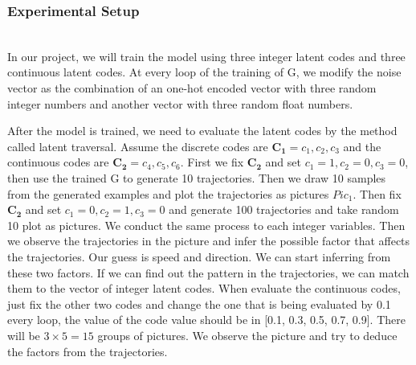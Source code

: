 \subsubsection{Experimental Setup}

\hfill \\
In our project, we will train the model using three integer latent codes and three continuous latent codes. At every loop of the training of G, we modify the noise vector as the combination of an one-hot encoded vector with three random integer numbers and another vector with three random float numbers.

After the model is trained, we need to evaluate the latent codes by the method called latent traversal. Assume the discrete codes are \(\mathbf{C_1} = c_1, c_2, c_3\) and the continuous codes are  \(\mathbf{C_2}= c_4, c_5, c_6\). First we fix \(\mathbf{C_2}\) and set \(c_1 = 1, c_2 = 0, c_3=0\), then use the trained G to generate 10 trajectories. Then we draw 10 samples from the generated examples and plot the trajectories as pictures \(Pic_1\). Then fix \(\mathbf{C_2}\) and set \(c_1=0, c_2 = 1, c_3 = 0\) and generate 100 trajectories and take random 10 plot as pictures. We conduct the same process to each integer variables. Then we observe the trajectories in the picture and infer the possible factor that affects the trajectories. Our guess is speed and direction. We can start inferring  from these two factors. If we can find out the pattern in the trajectories, we can match them to the vector of integer latent codes. When evaluate the continuous codes, just fix the other two codes and change the one that is being evaluated by 0.1 every loop, the value of the code value should be in [0.1, 0.3, 0.5, 0.7, 0.9]. There will be \(3 \times 5 = 15\) groups of pictures. We observe the picture and try to deduce the factors from the trajectories.